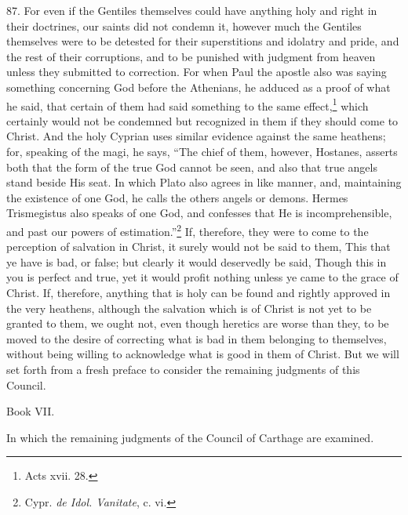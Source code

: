 87. For even if the Gentiles themselves could have anything holy and right in their doctrines, our saints did not condemn it, however much the Gentiles themselves were to be detested for their superstitions and idolatry and pride, and the rest of their corruptions, and to be punished with judgment from heaven unless they submitted to correction. For when Paul the apostle also was saying something concerning God before the Athenians, he adduced as a proof of what he said, that certain of them had said something to the same effect,\footnote{\par  Acts xvii. 28.} which certainly would not be condemned but recognized in them if they should come to Christ. And the holy Cyprian uses similar evidence against the same heathens; for, speaking of the magi, he says, ``The chief of them, however, Hostanes, asserts both that the form of the true God cannot be seen, and also that true angels stand beside His seat. In which Plato also agrees in like manner, and, maintaining the existence of one God, he calls the others angels or demons. Hermes Trismegistus also speaks of one God, and confesses that He is incomprehensible, and past our powers of estimation.''\footnote{\par  Cypr. \emph{de Idol. Vanitate}, c. vi.} If, therefore, they were to come to the perception of salvation in Christ, it surely would not be said to them, This that ye have is bad, or false; but clearly it would deservedly be said, Though this in you is perfect and true, yet it would profit nothing unless ye came to the grace of Christ. If, therefore, anything that is holy can be found and rightly approved in the very heathens, although the salvation which is of Christ is not yet to be granted to them, we ought not, even though heretics are worse than they, to be moved to the desire of correcting what is bad in them belonging to themselves, without being willing to acknowledge what is good in them of Christ. But we will set forth from a fresh preface to consider the remaining judgments of this Council.


Book VII.

In which the remaining judgments of the Council of Carthage are examined.


